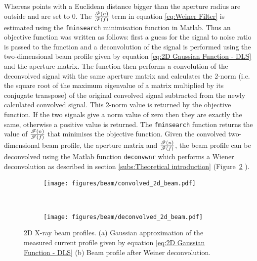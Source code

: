 Whereas points with a Euclidean distance bigger than the aperture radius are outside and are set to 0.
\newline
The $\frac{\mathscr{F}(n)}{\mathscr{F}(f)}$ term in equation \ref{eq:Weiner Filter} is estimated using the \verb+fminsearch+ minimisation function in Matlab.
Thus an objective function was written as follows: first a guess for the signal to noise ratio is passed to the function and a deconvolution of the signal is performed using the two-dimensional beam profile given by equation \ref{eq:2D Gaussian Function - DLS} and the aperture matrix.
The function then performs a convolution of the deconvolved signal with the same aperture matrix and calculates the 2-norm (i.e. the square root of the maximum eigenvalue of a matrix multiplied by its conjugate transpose) of the original convolved signal subtracted from the newly calculated convolved signal.
This 2-norm value is returned by the objective function.
If the two signals give a norm value of zero then they are exactly the same, otherwise a positive value is returned.
The \verb+fminsearch+ function returns the value of $\frac{\mathscr{F}(n)}{\mathscr{F}(f)}$ that minimises the objective function.
Given the convolved two-dimensional beam profile, the aperture matrix and $\frac{\mathscr{F}(n)}{\mathscr{F}(f)}$, the beam profile can be deconvolved using the Matlab function \verb+deconvwnr+ which performs a Wiener deconvolution as described in section \ref{subs:Theoretical introduction} (Figure~\ref{fig:Deconvolved 2D beam profile - DLS} ).
\begin{figure}
        \centering
        \begin{subfigure}[b]{0.9\textwidth}
                \centering
                \texttt{[image: figures/beam/convolved\_2d\_beam.pdf]}
                \caption{}
                \label{fig:Gaussian approximation of convolved Beam profile - DLS}
        \end{subfigure}
				\\
        \begin{subfigure}[b]{0.9\textwidth}
                \centering
                \texttt{[image: figures/beam/deconvolved\_2d\_beam.pdf]}
                \caption{}
                \label{fig:Deconvolved 2D beam profile - DLS}
        \end{subfigure}
        \caption{2D X-ray beam profiles.
        (a) Gaussian approximation of the measured current profile given by equation \ref{eq:2D Gaussian Function - DLS}
        (b) Beam profile after Weiner deconvolution.}
        \label{fig:2D relative X-ray beam profiles, convolved and deconvolved}
\end{figure}

